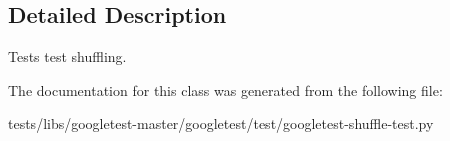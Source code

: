 \subsection{Detailed Description}
\begin{DoxyVerb}Tests test shuffling.\end{DoxyVerb}
 

The documentation for this class was generated from the following file\+:\begin{DoxyCompactItemize}
\item 
tests/libs/googletest-\/master/googletest/test/googletest-\/shuffle-\/test.\+py\end{DoxyCompactItemize}

